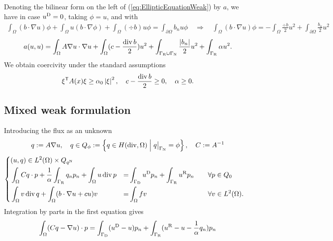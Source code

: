 Denoting the bilinear form on the left of (\ref{eq:EllipticEquationWeak}) by $a$, we have in case $u^{\rm D}=0$, taking $\phi=u$, and with
%
%
\begin{align*}
\int_{\Omega}(b\cdot \nabla u)\phi + \int_{\Omega}u (b\cdot \nabla \phi) + \int_{\Omega}(\div b) u\phi = \int_{\partial\Omega}b_n u\phi 
\quad\Rightarrow\quad \int_{\Omega}(b\cdot \nabla u)\phi = - \int_{\Omega}\frac{\div b}{2} u^2 + \int_{\partial\Omega}\frac{b_n}{2} u^2
\end{align*}
%
%
\begin{align*}
a(u,u) = \int_{\Omega} A\nabla u \cdot\nabla u  + \int_{\Omega}(c-\frac{\operatorname{div} b}{2})u^2 + \int_{\Gamma_{\rm R}\cup\Gamma_{\rm N}}\frac{\left|b_n\right|}{2} u^2+ \int_{\Gamma_{\rm R}}\alpha u^2.
\end{align*}
%
We obtain coercivity under the standard assumptions
%
\begin{equation}\label{eq:}
{\xi}^{\mathsf{T}}A(x)\xi \ge \alpha_0\left|\xi\right|^2,\quad c-\frac{\operatorname{div} b}{2}\ge0,\quad \alpha\ge0.
\end{equation}
%
%
%
\subsection{Mixed weak formulation}\label{subsec:}
%
Introducing the flux as an unknown
%
%
\begin{align*}
q := A\nabla u, \quad q\in Q_{\phi} := \SetDef{q\in \Hdiv}{\Rest{q}{\GammaN}=\phi}, \quad C := A^{-1}\\
\end{align*}
%
%
%
\begin{equation}\label{eq:}
%
\left\{
\begin{aligned}
&(u,q) \in L^2(\Omega)\times Q_{\qN}\\
&\int_{\Omega} Cq\cdot p +  \frac{1}{\alpha}\int_{\GammaR} q_np_n+ \int_{\Omega} u\div p &=& \int_{\GammaD}\uD p_n+\int_{\GammaR}\uR p_n&\quad &\forall p\in Q_0\\
&\int_{\Omega} v\div q + \int_{\Omega} (b\cdot\nabla u + cu)v&=& \int_{\Omega} fv &\quad&\forall v\in L^2(\Omega).
\end{aligned}
\right.
% 
\end{equation}
%
Integration by parts in the first equation gives
%
\begin{align*}
\int_{\Omega} (Cq-\nabla u)\cdot p =  \int_{\Gamma_{\rm D}}(u^{\rm D}-u) p_n + \int_{\Gamma_{\rm R}}(u^{\rm R} - u -  \frac{1}{\alpha}q_n)p_n 
\end{align*}
%

